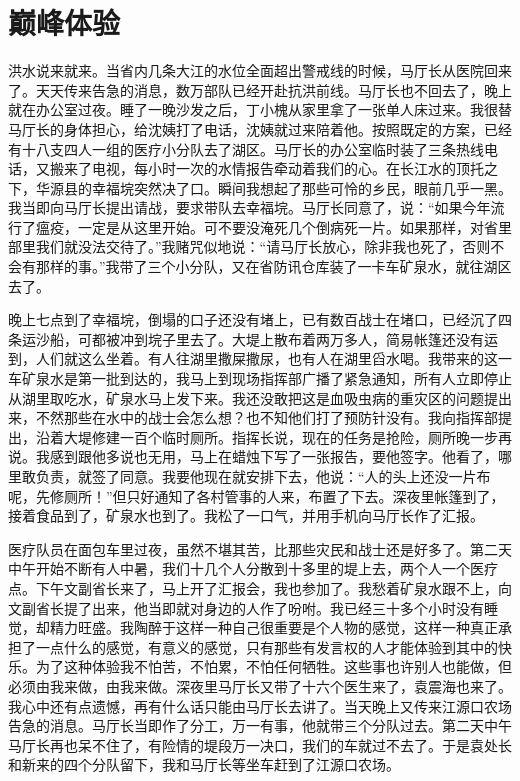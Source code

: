 \documentclass[12pt,oneside]{book}
\begin{document}
\chapter{巅峰体验}

洪水说来就来。当省内几条大江的水位全面超出警戒线的时候，马厅长从医院回来了。天天传来告急的消息，数万部队已经开赴抗洪前线。马厅长也不回去了，晚上就在办公室过夜。睡了一晚沙发之后，丁小槐从家里拿了一张单人床过来。我很替马厅长的身体担心，给沈姨打了电话，沈姨就过来陪着他。按照既定的方案，已经有十八支四人一组的医疗小分队去了湖区。马厅长的办公室临时装了三条热线电话，又搬来了电视，每小时一次的水情报告牵动着我们的心。在长江水的顶托之下，华源县的幸福垸突然决了口。瞬间我想起了那些可怜的乡民，眼前几乎一黑。我当即向马厅长提出请战，要求带队去幸福垸。马厅长同意了，说：``如果今年流行了瘟疫，一定是从这里开始。可不要没淹死几个倒病死一片。如果那样，对省里部里我们就没法交待了。''我赌咒似地说：``请马厅长放心，除非我也死了，否则不会有那样的事。''我带了三个小分队，又在省防讯仓库装了一卡车矿泉水，就往湖区去了。

晚上七点到了幸福垸，倒塌的口子还没有堵上，已有数百战士在堵口，已经沉了四条运沙船，可都被冲到垸子里去了。大堤上散布着两万多人，简易帐篷还没有运到，人们就这么坐着。有人往湖里撒屎撒尿，也有人在湖里舀水喝。我带来的这一车矿泉水是第一批到达的，我马上到现场指挥部广播了紧急通知，所有人立即停止从湖里取吃水，矿泉水马上发下来。我还没敢把这是血吸虫病的重灾区的问题提出来，不然那些在水中的战士会怎么想？也不知他们打了预防针没有。我向指挥部提出，沿着大堤修建一百个临时厕所。指挥长说，现在的任务是抢险，厕所晚一步再说。我感到跟他多说也无用，马上在蜡烛下写了一张报告，要他签字。他看了，哪里敢负责，就签了同意。我要他现在就安排下去，他说：``人的头上还没一片布呢，先修厕所！''但只好通知了各村管事的人来，布置了下去。深夜里帐篷到了，接着食品到了，矿泉水也到了。我松了一口气，并用手机向马厅长作了汇报。

医疗队员在面包车里过夜，虽然不堪其苦，比那些灾民和战士还是好多了。第二天中午开始不断有人中暑，我们十几个人分散到十多里的堤上去，两个人一个医疗点。下午文副省长来了，马上开了汇报会，我也参加了。我愁着矿泉水跟不上，向文副省长提了出来，他当即就对身边的人作了吩咐。我已经三十多个小时没有睡觉，却精力旺盛。我陶醉于这样一种自己很重要是个人物的感觉，这样一种真正承担了一点什么的感觉，有意义的感觉，只有那些有发言权的人才能体验到其中的快乐。为了这种体验我不怕苦，不怕累，不怕任何牺牲。这些事也许别人也能做，但必须由我来做，由我来做。深夜里马厅长又带了十六个医生来了，袁震海也来了。我心中还有点遗憾，再有什么话只能由马厅长去讲了。当天晚上又传来江源口农场告急的消息。马厅长当即作了分工，万一有事，他就带三个分队过去。第二天中午马厅长再也呆不住了，有险情的堤段万一决口，我们的车就过不去了。于是袁处长和新来的四个分队留下，我和马厅长等坐车赶到了江源口农场。
\end{document}
